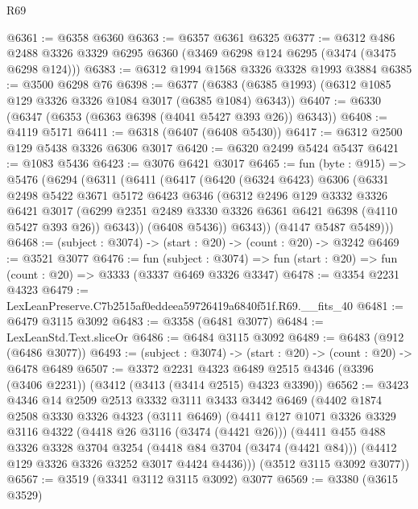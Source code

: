 \begin{lexlean}{R69}
\begin{coremodule}
@6361 := @6358 @6360
@6363 := @6357 @6361 @6325
@6377 := @6312
    @486
    @2488
    @3326
    @3329
    @6295
    @6360
    (@3469 @6298 @124 @6295 (@3474 (@3475 @6298 @124)))
@6383 := @6312 @1994 @1568 @3326 @3328 @1993 @3884
@6385 := @3500 @6298 @76
@6398 := @6377 (@6383 (@6385 @1993) (@6312 @1085 @129 @3326 @3326 @1084 @3017 (@6385 @1084) @6343))
@6407 := @6330 (@6347 (@6353 (@6363 @6398 (@4041 @5427 @393 @26)) @6343))
@6408 := @4119 @5171
@6411 := @6318 (@6407 (@6408 @5430))
@6417 := @6312 @2500 @129 @5438 @3326 @6306 @3017
@6420 := @6320 @2499 @5424 @5437
@6421 := @1083 @5436
@6423 := @3076 @6421 @3017
@6465 := fun (byte : @915) =>
  @5476
    (@6294
      (@6311
        (@6411
          (@6417
            (@6420
              (@6324 @6423)
              @6306
              (@6331
                @2498
                @5422
                @3671
                @5172
                @6423
                @6346
                (@6312
                  @2496
                  @129
                  @3332
                  @3326
                  @6421
                  @3017
                  (@6299 @2351 @2489 @3330 @3326 @6361 @6421 @6398 (@4110 @5427 @393 @26))
                  @6343))
              (@6408 @5436))
            @6343))
        (@4147 @5487 @5489)))
@6468 := (subject : @3074) -> (start : @20) -> (count : @20) -> @3242
@6469 := @3521 @3077
@6476 := fun (subject : @3074) =>
  fun (start : @20) => fun (count : @20) => @3333 (@3337 @6469 @3326 @3347)
@6478 := @3354 @2231 @4323
@6479 := LexLeanPreserve.C7b2515af0eddeea59726419a6840f51f.R69.__fits_40
@6481 := @6479 @3115 @3092
@6483 := @3358 (@6481 @3077)
@6484 := LexLeanStd.Text.sliceOr
@6486 := @6484 @3115 @3092
@6489 := @6483 (@912 (@6486 @3077))
@6493 := (subject : @3074) -> (start : @20) -> (count : @20) -> @6478 @6489
@6507 := @3372
    @2231
    @4323
    @6489
    @2515
    @4346
    (@3396 (@3406 @2231))
    (@3412 (@3413 (@3414 @2515) @4323 @3390))
@6562 := @3423
    @4346
    @14
    @2509
    @2513
    @3332
    @3111
    @3433
    @3442
    @6469
    (@4402
      @1874
      @2508
      @3330
      @3326
      @4323
      (@3111 @6469)
      (@4411
        @127
        @1071
        @3326
        @3329
        @3116
        @4322
        (@4418 @26 @3116 (@3474 (@4421 @26)))
        (@4411
          @455
          @488
          @3326
          @3328
          @3704
          @3254
          (@4418 @84 @3704 (@3474 (@4421 @84)))
          (@4412 @129 @3326 @3326 @3252 @3017 @4424 @4436)))
      (@3512 @3115 @3092 @3077))
@6567 := @3519 (@3341 @3112 @3115 @3092) @3077
@6569 := @3380 (@3615 @3529)

\end{coremodule}
\end{lexlean}
